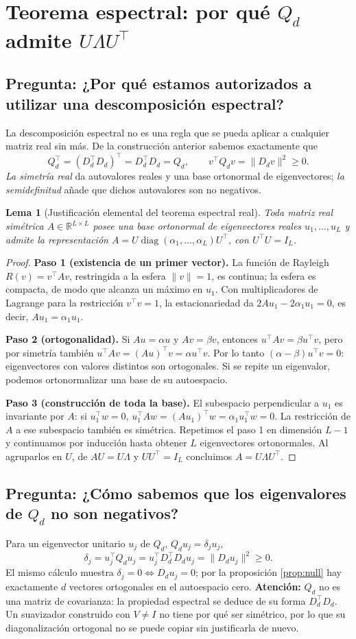 \documentclass[11pt,letterpaper,parskip=half,headings=small]{scrartcl}
\newtheorem{lema}[proposicion]{Lema}
\theoremstyle{definition}\newtheorem{definicion}[proposicion]{Definición}
\theoremstyle{remark}\newtheorem{observacion}[proposicion]{Observación}
\newcommand{\R}{\mathbb R}\newcommand{\EE}{\mathbb E}\newcommand{\Var}{\operatorname{Var}}
\newcommand{\pregunta}[1]{\subsection{Pregunta: #1}}
\begin{document}
\section{Teorema espectral: por qué $Q_d$ admite $U\Lambda U^\top$}
\pregunta{¿Por qué estamos autorizados a utilizar una descomposición espectral?}
La descomposición espectral no es una regla que se pueda aplicar a cualquier matriz real
sin más. De la construcción anterior sabemos exactamente que
\[
Q_d^\top=(D_d^\top D_d)^\top=D_d^\top D_d=Q_d,
\qquad v^\top Q_dv=\|D_dv\|^2\ge0.
\]
\emph{La simetría real} da autovalores reales y una base ortonormal de eigenvectores;
\emph{la semidefinitud} añade que dichos autovalores son no negativos.

\begin{lema}[Justificación elemental del teorema espectral real]\label{lem:espectral}
Toda matriz real simétrica $A\in\R^{L\times L}$ posee una base ortonormal
de eigenvectores reales $u_1,\ldots,u_L$ y admite la representación
$A=U\operatorname{diag}(\alpha_1,\ldots,\alpha_L)U^\top$, con $U^\top U=I_L$.
\end{lema}
\begin{proof}
\textbf{Paso 1 (existencia de un primer vector).} La función de Rayleigh
$R(v)=v^\top Av$, restringida a la esfera $\|v\|=1$, es continua; la esfera
es compacta, de modo que alcanza un máximo en $u_1$. Con multiplicadores
de Lagrange para la restricción $v^\top v=1$, la estacionariedad da
$2Au_1-2\alpha_1u_1=0$, es decir, $Au_1=\alpha_1u_1$.

\textbf{Paso 2 (ortogonalidad).} Si $Au=\alpha u$ y $Av=\beta v$, entonces
$u^\top Av=\beta u^\top v$, pero por simetría también
$u^\top Av=(Au)^\top v=\alpha u^\top v$.
Por lo tanto $(\alpha-\beta)u^\top v=0$: eigenvectores con valores distintos
son ortogonales. Si se repite un eigenvalor, podemos ortonormalizar una base
de su autoespacio.

\textbf{Paso 3 (construcción de toda la base).} El subespacio perpendicular
a $u_1$ es invariante por $A$: si $u_1^\top w=0$,
$u_1^\top Aw=(Au_1)^\top w=\alpha_1u_1^\top w=0$.
La restricción de $A$ a ese subespacio también es simétrica. Repetimos
el paso 1 en dimensión $L-1$ y continuamos por inducción hasta obtener
$L$ eigenvectores ortonormales. Al agruparlos en $U$, de $AU=U\Lambda$
y $UU^\top=I_L$ concluimos $A=U\Lambda U^\top$.
\end{proof}

\pregunta{¿Cómo sabemos que los eigenvalores de $Q_d$ no son negativos?}
Para un eigenvector unitario $u_j$ de $Q_d$, $Q_du_j=\delta_ju_j$,
\[
\delta_j=u_j^\top Q_du_j=u_j^\top D_d^\top D_du_j=\|D_du_j\|^2\ge0.
\]
El mismo cálculo muestra $\delta_j=0\iff D_du_j=0$; por la proposición
\ref{prop:null} hay exactamente $d$ vectores ortogonales en el autoespacio cero.
\textbf{Atención:} $Q_d$ no es una matriz de covarianza: la propiedad espectral
se deduce de su forma $D_d^\top D_d$. Un suavizador construido con $V\neq I$
no tiene por qué ser simétrico, por lo que su diagonalización ortogonal no se
puede copiar sin justificarla de nuevo.
\end{document}
